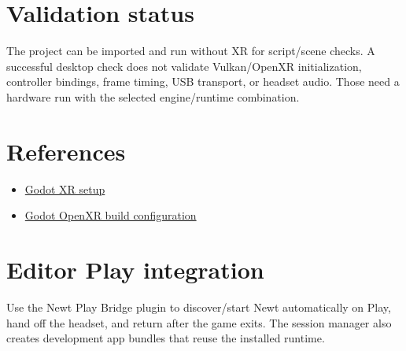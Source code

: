 \documentclass[11pt]{article}
\begin{document}
\section{Validation status}
\label{sec:org2f8a168}
The project can be imported and run without XR for script/scene checks. A successful desktop check does not validate Vulkan/OpenXR initialization, controller bindings, frame timing, USB transport, or headset audio. Those need a hardware run with the selected engine/runtime combination.
\section{References}
\label{sec:org1bff404}
\begin{itemize}
\item \href{https://docs.godotengine.org/en/stable/tutorials/xr/setting\_up\_xr.html}{Godot XR setup}
\item \href{https://github.com/godotengine/godot/blob/master/modules/openxr/config.py}{Godot OpenXR build configuration}
\end{itemize}
\section{Editor Play integration}
\label{sec:org271ada3}
Use the Newt Play Bridge plugin to discover/start Newt automatically on Play, hand off the headset, and return after the game exits. The session manager also creates development app bundles that reuse the installed runtime.
\end{document}
